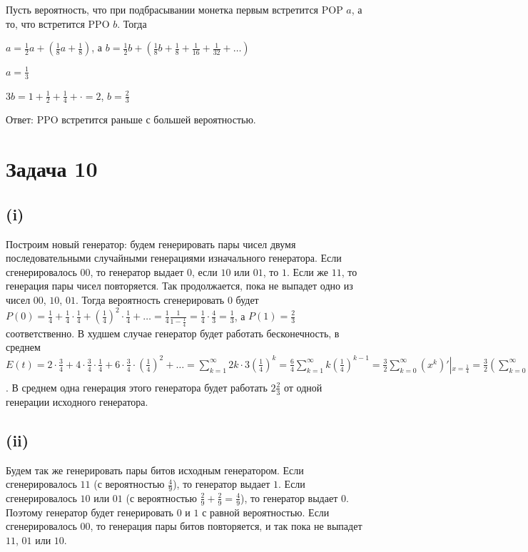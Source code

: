 \documentclass[a4paper,12pt]{article} %
\begin{document}
Пусть вероятность, что при подбрасывании монетка первым встретится POP $a$, а то, что встретится PPO $b$. Тогда

$a=\frac{1}{2}a+(\frac{1}{8}a+\frac{1}{8})$, а $b=\frac{1}{2}b+(\frac{1}{8}b+\frac{1}{8}+\frac{1}{16}+\frac{1}{32}+\ldots)$

$a=\frac{1}{3}$

$3b=1+\frac{1}{2}+\frac{1}{4}+\cdot=2$, $b=\frac{2}{3}$

Ответ: PPO встретится раньше с большей вероятностью.






\section{Задача 10}
\subsection{(i)}
\hspace{5mm}
Построим новый генератор: будем генерировать пары чисел двумя последовательными случайными генерациями изначального генератора. Если сгенерировалось $00$, то генератор выдает $0$, если $10$ или $01$, то $1$. Если же $11$, то генерация пары чисел повторяется. Так продолжается, пока не выпадет одно из чисел $00$, $10$, $01$. Тогда вероятность сгенерировать $0$ будет $P(0)=\frac{1}{4}+\frac{1}{4}\cdot\frac{1}{4}+(\frac{1}{4})^2\cdot\frac{1}{4}+\ldots=\frac{1}{4}\frac{1}{1-\frac{1}{4}}=\frac{1}{4}\cdot\frac{4}{3}=\frac{1}{3}$, а $P(1)=\frac{2}{3}$ соответственно. В худшем случае генератор будет работать бесконечность, в среднем $E(t)=2\cdot\frac{3}{4}+4\cdot\frac{3}{4}\cdot\frac{1}{4}+6\cdot\frac{3}{4}\cdot(\frac{1}{4})^2+\ldots=\sum\limits_{k=1}^{\infty}2k\cdot3(\frac{1}{4})^k
=\frac{6}{4}\sum\limits_{k=1}^{\infty}k(\frac{1}{4})^{k-1}
=\frac{3}{2}\sum\limits_{k=0}^{\infty}\left(x^k\right)'|_{x=\frac{1}{4}}
=\frac{3}{2}\left(\sum\limits_{k=0}^{\infty}x^k\right)'|_{x=\frac{1}{4}}
=\frac{3}{2}\cdot\left(\frac{1}{1-x}\right)'|_{x=\frac{1}{4}}=
\frac{3}{2}\frac{1}{(1-x)^2}|_{x=\frac{1}{4}}=\frac{3\cdot16}{2\cdot 9}=\frac{8}{3}$. В среднем одна генерация этого генератора будет работать $2\frac{2}{3}$ от одной генерации исходного генератора.

\subsection{(ii)}
\hspace{5mm}
Будем так же генерировать пары битов исходным генератором. Если сгенерировалось $11$ (с вероятностью $\frac{4}{9}$), то генератор выдает $1$. Если сгенерировалось $10$ или $01$ (с вероятностью $\frac{2}{9}+\frac{2}{9}=\frac{4}{9}$), то генератор выдает $0$. Поэтому генератор будет генерировать $0$ и $1$ с равной вероятностью. Если сгенерировалось $00$, то генерация пары битов повторяется, и так пока не выпадет $11$, $01$ или $10$.
\end{document}
